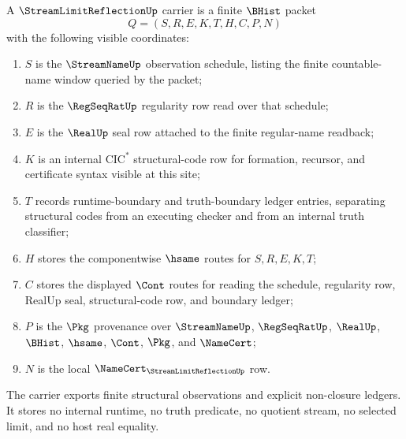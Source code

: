 \begin{definition}
\label{def:stream-limit-reflection-carrier}
A $\StreamLimitReflectionUp$ carrier is a finite $\BHist$ packet
$$
Q=(S,R,E,K,T,H,C,P,N)
$$
with the following visible coordinates:
\begin{enumerate}
\item $S$ is the $\StreamNameUp$ observation schedule, listing the finite countable-name window queried by the packet;
\item $R$ is the $\RegSeqRatUp$ regularity row read over that schedule;
\item $E$ is the $\RealUp$ seal row attached to the finite regular-name readback;
\item $K$ is an internal $\mathrm{CIC}^{*}$ structural-code row for formation, recursor, and certificate syntax visible at this site;
\item $T$ records runtime-boundary and truth-boundary ledger entries, separating structural codes from an executing checker and from an internal truth classifier;
\item $H$ stores the componentwise $\hsame$ routes for $S,R,E,K,T$;
\item $C$ stores the displayed $\Cont$ routes for reading the schedule, regularity row, RealUp seal, structural-code row, and boundary ledger;
\item $P$ is the $\Pkg$ provenance over $\StreamNameUp$, $\RegSeqRatUp$, $\RealUp$, $\BHist$, $\hsame$, $\Cont$, $\Pkg$, and $\NameCert$;
\item $N$ is the local $\NameCert_{\StreamLimitReflectionUp}$ row.
\end{enumerate}
The carrier exports finite structural observations and explicit non-closure ledgers. It stores no internal runtime, no truth predicate, no quotient stream, no selected limit, and no host real equality.
\end{definition}

